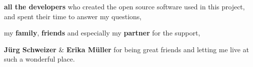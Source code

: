 \documentclass[a4paper,10pt,twoside,titlepage,headings=small,bibliography=totocnumbered,headsepline]{scrartcl}
\begin{document}
\textbf{all the developers} who created the open source software used in this project, and spent their time to answer my questions,

my \textbf{family}, \textbf{friends} and especially my \textbf{partner} for the support,

\textbf{J\"urg Schweizer} \& \textbf{Erika M\"uller} for being great friends and letting me live at such a wonderful place.

\end{document}
